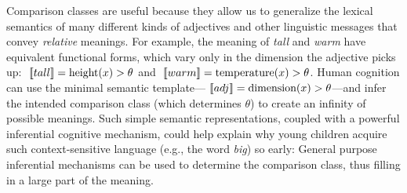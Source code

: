 \documentclass[doc]{apa6}
\begin{document}


Comparison classes are useful because they allow us to generalize the lexical semantics of many different kinds of adjectives and other linguistic messages that convey \emph{relative} meanings. 
For example, the meaning of \emph{tall} and \emph{warm} have equivalent functional forms, which vary only in the dimension the adjective picks up: $\mbox{ $[\![ tall ]\!]$} = \text{height}(x) > \theta$ and $\mbox{ $[\![ warm ]\!]$} = \text{temperature}(x) > \theta$. 
Human cognition can use the minimal semantic template---$\mbox{ $[\![ adj ]\!]$} = \text{dimension}(x) > \theta$---and infer the intended comparison class (which determines $\theta$) to create an infinity of possible meanings.
Such simple semantic representations, coupled with a powerful inferential cognitive mechanism, could help explain why young children acquire such context-sensitive language (e.g., the word \emph{big}) so early: General purpose inferential mechanisms can be used to determine the comparison class, thus filling in a large part of the meaning. 
\end{document}
